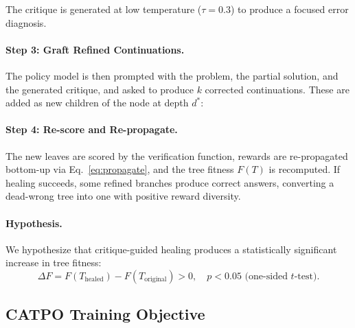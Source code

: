 \documentclass{article} %
\begin{document}
\vspace{0.5em}
\noindent{}
\vspace{0.5em}

The critique is generated at low temperature ($\tau = 0.3$) to produce a focused error diagnosis.

\paragraph{Step 3: Graft Refined Continuations.} The policy model is then prompted with the problem, the partial solution, and the generated critique, and asked to produce $k$ corrected continuations. These are added as new children of the node at depth $d^*$:

\vspace{0.5em}
\noindent{}
\vspace{0.5em}

\paragraph{Step 4: Re-score and Re-propagate.} The new leaves are scored by the verification function, rewards are re-propagated bottom-up via Eq.~\ref{eq:propagate}, and the tree fitness $F(T)$ is recomputed. If healing succeeds, some refined branches produce correct answers, converting a dead-wrong tree into one with positive reward diversity.

\paragraph{Hypothesis.} We hypothesize that critique-guided healing produces a statistically significant increase in tree fitness:
\begin{equation}
    \Delta F = F(T_\text{healed}) - F(T_\text{original}) > 0, \quad p < 0.05 \text{ (one-sided $t$-test)}.
\end{equation}


\subsection{CATPO Training Objective}
\label{sec:objective}
\end{document}
